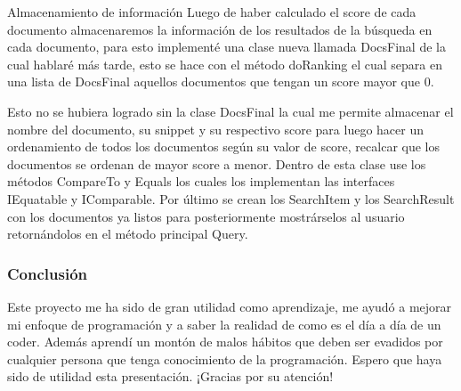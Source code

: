 \documentclass{beamer}
\begin{document}
\begin{frame}{Almacenamiento de información}
  Luego de haber calculado el score de cada documento almacenaremos 
        la información de los resultados de la búsqueda en cada documento,
        para esto implementé una clase nueva llamada DocsFinal de la cual hablaré
        más tarde, esto se hace con el método doRanking el cual separa en una lista
        de DocsFinal aquellos documentos que tengan un score mayor que 0.

        Esto no se hubiera logrado sin la clase DocsFinal la cual me permite almacenar
        el nombre del documento, su snippet y su respectivo score para luego hacer 
        un ordenamiento de todos los documentos según su valor de score, recalcar que 
        los documentos se ordenan de mayor score a menor. Dentro de esta clase use los métodos
        CompareTo y Equals los cuales los implementan las interfaces IEquatable y IComparable.
        Por último se crean los SearchItem y los SearchResult con los documentos ya listos para
        posteriormente mostrárselos al usuario retornándolos en el método principal Query.
\end{frame}
\begin{frame}
  \frametitle{Conclusión}
        Este proyecto me ha sido de gran utilidad como aprendizaje, me ayudó a mejorar mi enfoque de programación
        y a saber la realidad de como es el día a día de un coder. Además aprendí un montón de malos hábitos que
        deben ser evadidos por cualquier persona que tenga conocimiento de la programación. Espero que haya sido de utilidad esta presentación. ¡Gracias por su atención!
\end{frame}
\end{document}
